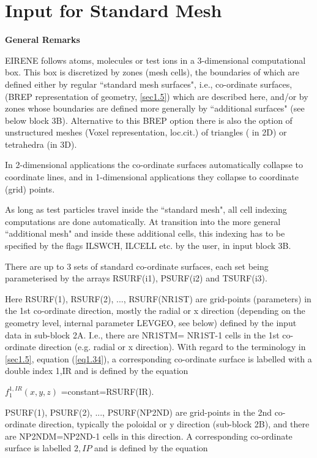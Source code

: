 \newpage
\section{Input for Standard Mesh} \label{sec2.2}
%

\medskip

\noindent

{\bf General Remarks}

\medskip

\noindent

EIRENE follows atoms, molecules or test ions in a 3-dimensional
computational box. This box is discretized by
zones (mesh cells), the boundaries of which are
defined either by regular ``standard mesh surfaces", i.e., co-ordinate
surfaces, (BREP representation of geometry, \ref{sec1.5}) which are described here, and/or by zones whose
boundaries are defined more generally
by ``additional surfaces" (see below block 3B).
Alternative to this BREP option there is also the option of unstructured meshes (Voxel representation, loc.cit.) of triangles ( in 2D)
or tetrahedra (in 3D).

In 2-dimensional applications the co-ordinate surfaces automatically collapse to
coordinate lines, and in 1-dimensional applications they collapse to coordinate (grid) points.

As long as test particles travel inside the ``standard mesh", all
cell indexing computations are done automatically. At transition into
the more general ``additional mesh" and inside these additional
cells, this indexing has
to be specified by the flags ILSWCH, ILCELL etc. by the user, in
input block 3B.

There are up to 3 sets of standard co-ordinate surfaces, each set being parameterised by the arrays
RSURF(i1), PSURF(i2) and TSURF(i3).

Here RSURF(1), RSURF(2), ...,
RSURF(NR1ST) are grid-points (parameters) in the 1st co-ordinate direction, mostly the radial or x direction
(depending on the
geometry level, internal parameter LEVGEO, see below) defined by the input data in sub-block 2A.
I.e., there are NR1STM= NR1ST-1 cells in the 1st co-ordinate direction (e.g. radial or x direction).
With regard to the terminology in \ref{sec1.5}, equation (\ref{eq1.34}), a
corresponding co-ordinate surface is labelled with a double index 1,IR
and is defined by the equation

$f_1^{1,IR} (x,y,z)$
=constant=RSURF(IR).

PSURF(1), PSURF(2), ..., PSURF(NP2ND) are grid-points in the 2nd co-ordinate direction,
typically the poloidal or y direction (sub-block 2B), and there are
NP2NDM=NP2ND-1 cells in this direction.
A corresponding
co-ordinate surface is labelled $2,IP$ and is defined by the equation

